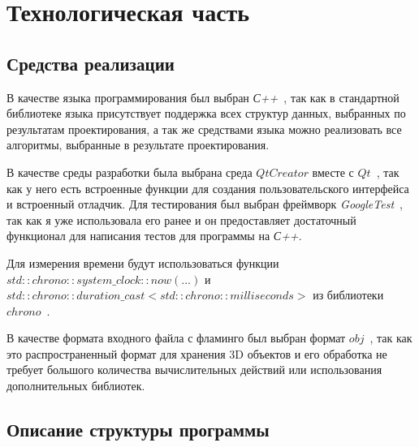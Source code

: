 \chapter{Технологическая часть}

\section{Средства реализации}

В качестве языка программирования был выбран \textit{С++}~\cite{cpp}, так как в стандартной библиотеке языка присутствует поддержка всех структур данных, выбранных по результатам проектирования, а так же средствами языка можно реализовать все алгоритмы, выбранные в результате проектирования.

В качестве среды разработки была выбрана среда $Qt Creator$ вместе с $Qt$~\cite{qt}, так как у него есть встроенные функции для создания пользовательского интерфейса и встроенный отладчик.
Для тестирования был выбран фреймворк \textit{GoogleTest}~\cite{gtest}, так как я уже использовала его ранее и он предоставляет достаточный функционал для написания тестов для программы на \textit{С++}.

Для измерения времени будут использоваться функции \textit{$std::chrono::system\_clock::now(...)$} и \textit{$std::chrono::duration\_cast<std::chrono::milliseconds>$} из библиотеки $chrono$~\cite{cpp-lang-chrono}.

В качестве формата входного файла с фламинго был выбран формат $obj$~\cite{obj}, так как это распространенный формат для хранения 3D объектов и его обработка не требует большого количества  вычислительных действий или использования дополнительных библиотек.

\section{Описание структуры программы}

